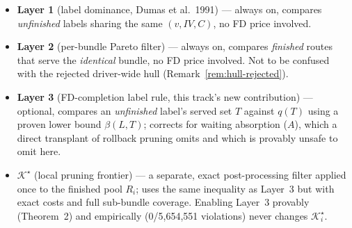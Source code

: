 \documentclass[11pt]{article}
\newcommand{\Ks}{\mathcal{K}^{\star}}
\begin{document}
\begin{itemize}
\item \textbf{Layer 1} (label dominance, Dumas et al.\ 1991) --- always on, compares
      \emph{unfinished} labels sharing the same $(v,IV,C)$, no FD price involved.
\item \textbf{Layer 2} (per-bundle Pareto filter) --- always on, compares \emph{finished}
      routes that serve the \emph{identical} bundle, no FD price involved. Not to be confused
      with the rejected driver-wide hull (Remark~\ref{rem:hull-rejected}).
\item \textbf{Layer 3} (FD-completion label rule, this track's new contribution) --- optional,
      compares an \emph{unfinished} label's served set $T$ against $q(T)$ using a proven lower
      bound $\beta(L,T)$; corrects for waiting absorption ($A$), which a direct transplant of
      rollback pruning omits and which is provably unsafe to omit here.
\item \textbf{$\Ks$} (local pruning frontier) --- a separate, exact post-processing filter
      applied once to the finished pool $R_i$; uses the same inequality as Layer~3 but with
      exact costs and full sub-bundle coverage. Enabling Layer~3 provably (Theorem~2) and
      empirically (0/5{,}654{,}551 violations) never changes $\Ks_i$.
\end{itemize}
\end{document}
